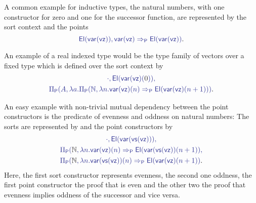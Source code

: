\begin{example}
A common example for inductive types, the natural numbers, with one constructor for
zero and one for the successor function, are represented by the sort context
\tqm{\cdot_\Sc, \UU} and the points
\begin{equation*}
\tqm{\El(\var(\vz)), \var(\vz) \Rightarrow_\Pc \El(\var(\vz))} \text{.}
\end{equation*}

An example of a real indexed type would be the type family of vectors over a fixed
type  which is defined over the sort context
 by
\begin{equation*}
\begin{gathered}
\tqm{\cdot, \El(\var(\vz)(\blm{0})),}\\
\tqm{\Pi_\Pc(A, \lambda a. \Pi_\Pc(\N, \lambda n. \var(\vz)(n) \Rightarrow_\Pc \El(\var(\vz)(n + 1)))} \text{.}
\end{gathered}
\end{equation*}

An easy example with non-trivial mutual dependency between the point constructors
is the predicate of evenness and oddness on natural numbers: The sorts are
represented by 
and the point constructors by
\begin{equation*}
\begin{gathered}
\tqm{\cdot , \El(\var(\vs(\vz))),} \\
\tqm{\Pi_\Pc(\blm{\N}, \lambda n. \var(\vz)(n) \Rightarrow_\Pc \El(\var(\vs(\vz))(n + 1)),} \\
\tqm{\Pi_\Pc(\blm{\N}, \lambda n. \var(\vs(\vz))(n) \Rightarrow_\Pc \El(\var(\vz)(n + 1))} \text{.}
\end{gathered}
\end{equation*}
Here, the first sort constructor represents evenness, the second one oddness,
the first point constructor the proof that  is even and the other two the
proof that evenness implies oddness of the successor and vice versa.
\end{example}

